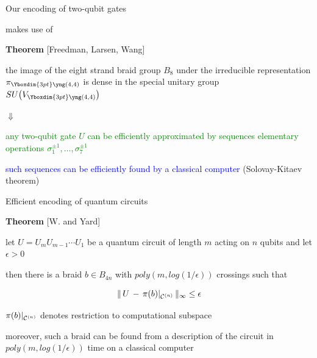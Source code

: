 \documentclass{prosper}
\renewcommand{\>}{\rangle}
\newcommand{\<}{\langle}
\begin{document}
\begin{slide}{Our encoding of two-qubit gates}

makes use of 

\bigskip
\textbf{Theorem} [Freedman, Larsen, Wang] 

\bigskip
the image of the eight strand braid group $B_{8}$ under the
irreducible representation $\pi_{\Yboxdim{3pt}\yng(4,4)}{}$ is dense
in the special unitary group $SU\big(V_{\Yboxdim{3pt}\yng(4,4)}\big)$

\begin{center}{\large $\Downarrow$}\end{center}

\medskip
\textcolor{green}{any two-qubit gate $U$ can be efficiently
approximated by sequences elementary operations $\sigma_1^{\pm
1},\ldots,\sigma_7^{\pm 1}$}

\bigskip
\textcolor{blue}{such sequences can be efficiently found by a
classical computer} (Solovay-Kitaev theorem)

\end{slide}


\begin{slide}{Efficient encoding of quantum circuits}

\textbf{Theorem} [W. and Yard]

\medskip
let $U=U_{m} U_{m-1} \cdots U_1$ be a quantum circuit of length $m$
acting on $n$ qubits and let $\epsilon > 0$

\medskip
then there is a braid $b\in B_{4n}$ with $poly(m, log(1/\epsilon))$
crossings such that

\[
\|\, U\, -\, \pi(b)|_{{\cal C}^{(n)}}\, \|_{\infty}
\leq
\epsilon
\]

\medskip
$\pi(b)|_{{\cal C}^{(n)}}$ denotes restriction to computational subspace

\bigskip
moreover, such a braid can be found from a description of the circuit in
$poly(m, log(1/\epsilon))$ time on a classical computer

\end{slide}

\end{document}
